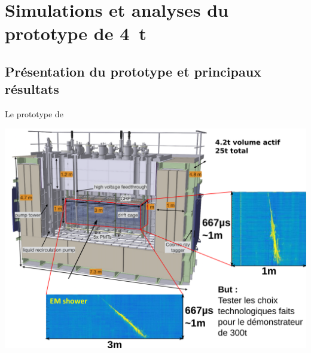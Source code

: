     
    
    \section[Analyse du \SI{4}{\tonne}]{Simulations et analyses du prototype de \SI{4}{\tonne}}
    
    {
        \begin{specialframe}
            \vspace{2cm}\hspace*{-1.8cm}\parbox[t]{\textwidth}{
                \begin{center}
                    \begin{Huge}
                            \textcolor{pheniics_purple}{\textbf{\insertsection}}
                    \end{Huge}
                \end{center}
            }
        \end{specialframe}
    }

    
    \subsection[Présentation]{Présentation du prototype et principaux résultats}
   
    \begin{frame}{Le prototype de \TOO{}}
   		\begin{scriptsize}
        	\centering
        	\includegraphics[width=\textwidth]{./pictures/311_2.png}        	
		\end{scriptsize}
   	\end{frame}
   	

